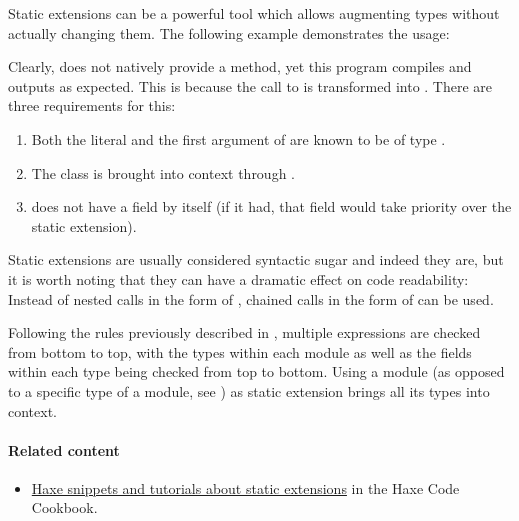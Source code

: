 
Static extensions can be a powerful tool which allows augmenting types without actually changing them. The following example demonstrates the usage:


Clearly,  does not natively provide a  method, yet this program compiles and outputs  as expected. This is because the call to  is transformed into . There are three requirements for this:

\begin{enumerate}
	\item Both the literal  and the first argument of  are known to be of type .
	\item The class  is brought into context through .
	\item {} does not have a  field by itself (if it had, that field would take priority over the static extension).
\end{enumerate}

Static extensions are usually considered syntactic sugar and indeed they are, but it is worth noting that they can have a dramatic effect on code readability: Instead of nested calls in the form of , chained calls in the form of  can be used.

Following the rules previously described in , multiple  expressions are checked from bottom to top, with the types within each module as well as the fields within each type being checked from top to bottom. Using a module (as opposed to a specific type of a module, see ) as static extension brings all its types into context.


\paragraph{Related content}
\begin{itemize}
	\item \href{http://code.haxe.org/tag/static-extension.html}{Haxe snippets and tutorials about static extensions} in the Haxe Code Cookbook.
\end{itemize}


